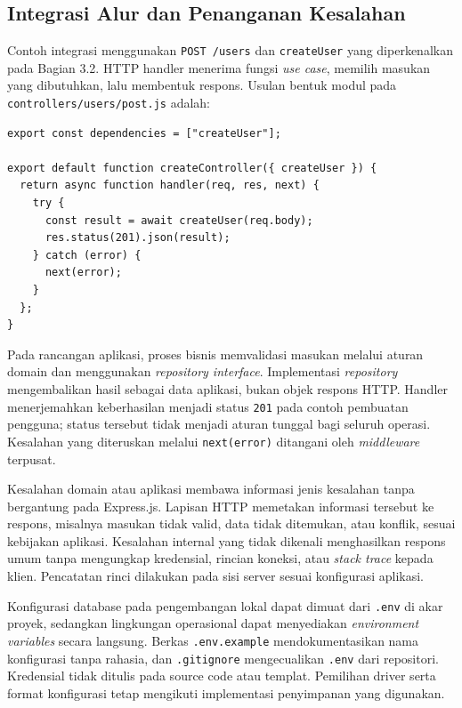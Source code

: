 \documentclass[12pt,a4paper,oneside]{report}
\begin{document}
\subsection{Integrasi Alur dan Penanganan Kesalahan}
Contoh integrasi menggunakan \texttt{POST /\allowbreak users} dan \texttt{createUser} yang diperkenalkan pada Bagian 3.2. HTTP handler menerima fungsi \textit{use case}, memilih masukan yang dibutuhkan, lalu membentuk respons. Usulan bentuk modul pada \texttt{controllers/\allowbreak users/\allowbreak post.js} adalah:
\begin{samepage}
\begin{singlespace}
\begin{verbatim}
export const dependencies = ["createUser"];

export default function createController({ createUser }) {
  return async function handler(req, res, next) {
    try {
      const result = await createUser(req.body);
      res.status(201).json(result);
    } catch (error) {
      next(error);
    }
  };
}
\end{verbatim}
\end{singlespace}
\end{samepage}
Pada rancangan aplikasi, proses bisnis memvalidasi masukan melalui aturan domain dan menggunakan \textit{repository interface}. Implementasi \textit{repository} mengembalikan hasil sebagai data aplikasi, bukan objek respons HTTP. Handler menerjemahkan keberhasilan menjadi status \texttt{201} pada contoh pembuatan pengguna; status tersebut tidak menjadi aturan tunggal bagi seluruh operasi. Kesalahan yang diteruskan melalui \texttt{next(error)} ditangani oleh \textit{middleware} terpusat.

Kesalahan domain atau aplikasi membawa informasi jenis kesalahan tanpa bergantung pada Express.js. Lapisan HTTP memetakan informasi tersebut ke respons, misalnya masukan tidak valid, data tidak ditemukan, atau konflik, sesuai kebijakan aplikasi. Kesalahan internal yang tidak dikenali menghasilkan respons umum tanpa mengungkap kredensial, rincian koneksi, atau \textit{stack trace} kepada klien. Pencatatan rinci dilakukan pada sisi server sesuai konfigurasi aplikasi.

Konfigurasi database pada pengembangan lokal dapat dimuat dari \texttt{.env} di akar proyek, sedangkan lingkungan operasional dapat menyediakan \textit{environment variables} secara langsung. Berkas \texttt{.env.example} mendokumentasikan nama konfigurasi tanpa rahasia, dan \texttt{.gitignore} mengecualikan \texttt{.env} dari repositori. Kredensial tidak ditulis pada source code atau templat. Pemilihan driver serta format konfigurasi tetap mengikuti implementasi penyimpanan yang digunakan.
\end{document}

